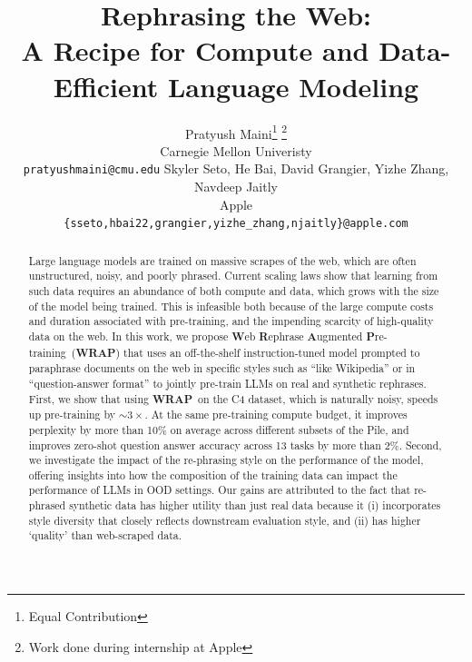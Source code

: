 \documentclass[table]{article}
\title{Rephrasing the Web:\\A Recipe for Compute and Data-Efficient Language Modeling}
\author{Pratyush Maini\thanks{Equal Contribution} \hspace{0.5mm}\thanks{Work done during internship at Apple} \\
Carnegie Mellon Univeristy\\
\texttt{pratyushmaini@cmu.edu}
\And Skyler Seto\footnotemark[1], He Bai, David Grangier, Yizhe Zhang, Navdeep Jaitly\\
Apple \\
\texttt{\{sseto,hbai22,grangier,yizhe\_zhang,njaitly\}@apple.com}\\
}
\newcommand{\ours}{\textbf{WRAP}}
\begin{document}
\maketitle

\begin{abstract}
    Large language models are trained on massive scrapes of the web, which are often unstructured, noisy, and poorly phrased. 
    Current scaling laws show that learning from such data requires an abundance of both compute and data, which grows with the size of the model being trained. 
     This is infeasible both because of the large compute costs and duration associated with pre-training, and the impending scarcity of high-quality data on the web.  
    In this work, we propose \textbf{W}eb \textbf{R}ephrase \textbf{A}ugmented \textbf{P}re-training~(\ours) that uses an off-the-shelf instruction-tuned model prompted to paraphrase documents on the web in specific styles such as ``like Wikipedia'' or in ``question-answer format'' to jointly pre-train LLMs on real and synthetic rephrases. First,  we show that using \ours~on the C4 dataset, which is naturally noisy, 
    speeds up pre-training by $\sim3\times$. At the same pre-training compute budget, it
    improves perplexity by more than 10\% on average across different subsets of the Pile, and improves zero-shot question answer accuracy across 13 tasks by more than 2\%. Second, we investigate the impact of the re-phrasing style on the performance of the model, offering insights into how the composition of the training data can impact the performance of LLMs in OOD settings. Our gains are attributed to the fact that re-phrased synthetic data has higher utility than just real data because it (i) incorporates style diversity that closely reflects downstream evaluation style, and (ii) has higher `quality' than web-scraped data.
    
\end{abstract}
\end{document}
